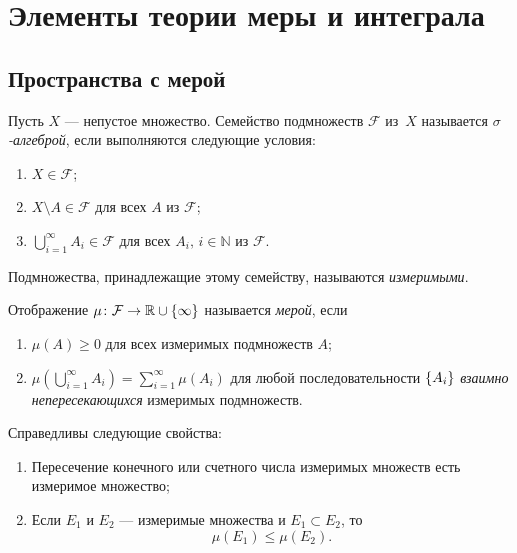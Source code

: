 \section{Элементы теории меры и интеграла}
\subsection{Пространства с мерой}

\begin{definition}
    Пусть $X$ --- непустое множество. Семейство подмножеств $\mathcal{F}$ из~$X$ называется
    \emph{$\sigma$-алгеброй}, если выполняются следующие условия:
    \begin{enumerate}
        \item $X \in \mathcal F$;
        \item $X \setminus A \in \mathcal F$ для всех $A$ из $\mathcal F$;
        \item $\bigcup\limits_{i=1}^\infty A_i \in \mathcal F$ для всех $A_i, \, i
            \in \mathbb N$ из $\mathcal F$.
    \end{enumerate}

    Подмножества, принадлежащие этому семейству, называются \emph{измеримыми}.
\end{definition}

\begin{definition}
    Отображение $\mu \colon \mathcal F \to \mathbb{R} \cup \left\{\infty\right\}$
    называется \emph{мерой}, если
    \begin{enumerate}
        \item $\mu(A) \geq 0$ для всех измеримых подмножеств $A$;
        \item $\mu\left(\bigcup\limits_{i=1}^\infty A_i\right) =
            \sum\limits_{i=1}^\infty \mu(A_i)$ для любой последовательности
            $\left\{A_i\right\}$ \emph{взаимно непересекающихся} измеримых подмножеств.
    \end{enumerate}
\end{definition}

\begin{theorem}
    Справедливы следующие свойства:
    \begin{enumerate}
        \item Пересечение конечного или счетного числа измеримых
            множеств есть измеримое множество;
        \item Если $E_1$ и $E_2$ --- измеримые множества и $E_1 \subset E_2$,
            то 
            \[ \mu(E_1) \leq \mu(E_2). \]
    \end{enumerate}
\end{theorem}

